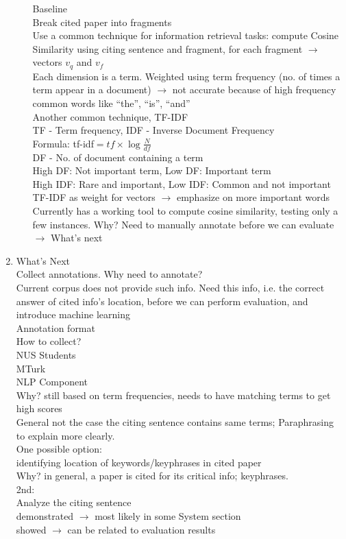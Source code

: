 \documentclass[12 pt]{article}
\begin{document}
\begin{enumerate}
\begin{enumerate}
Baseline\\
Break cited paper into fragments\\
Use a common technique for information retrieval tasks: compute Cosine Similarity using citing sentence and fragment, for each fragment $\rightarrow$ vectors $v_q$ and $v_f$\\
Each dimension is a term. Weighted using term frequency (no. of times a term appear in a document) $\rightarrow$ not accurate because of high frequency common words like ``the'', ``is'', ``and''\\
Another common technique, TF-IDF\\
TF - Term frequency, IDF - Inverse Document Frequency\\
Formula: tf-idf$ = tf \times \log{\frac{N}{df}}$\\
DF - No. of document containing a term\\
High DF: Not important term, Low DF: Important term\\
High IDF: Rare and important, Low IDF: Common and not important\\
TF-IDF as weight for vectors $\rightarrow$ emphasize on more important words\\

Currently has a working tool to compute cosine similarity, testing only a few instances. Why? Need to manually annotate before we can evaluate $\rightarrow$ What's next
\end{enumerate}
\item What's Next\\
Collect annotations. Why need to annotate?\\
Current corpus does not provide such info. Need this info, i.e. the correct answer of cited info's location, before we can perform evaluation, and introduce machine learning\\
Annotation format\\
How to collect?\\
NUS Students\\
MTurk\\

NLP Component\\
Why? still based on term frequencies, needs to have matching terms to get high scores\\
General not the case the citing sentence contains same terms; Paraphrasing to explain more clearly.\\
One possible option:\\
identifying location of keywords/keyphrases in cited paper\\
Why? in general, a paper is cited for its critical info; keyphrases.\\
2nd:\\
Analyze the citing sentence\\
demonstrated $\rightarrow$ most likely in some System section\\
showed $\rightarrow$ can be related to evaluation results
\end{enumerate}
\end{document}

